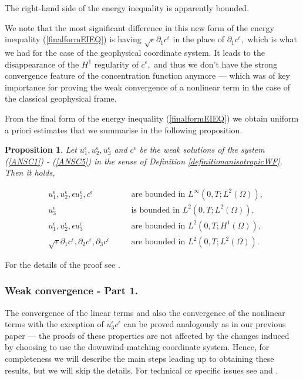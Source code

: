 \documentclass[11pt]{article}
\newtheorem{prop}{Proposition}
\begin{document}
The right-hand side of the energy inequality is apparently bounded.

We note that the most significant difference in this new form of the energy inequality (\ref{finalformEIEQ}) is having $\sqrt{\epsilon} \partial_1 c^\epsilon$ in the place of $\partial_1 c^\epsilon,$ which is what we had for the case of the geophysical coordinate system. It leads to the disappearance of the $H^1$ regularity of $c^\epsilon,$ and thus we don't have the strong convergence feature of the concentration function anymore --- which was of key importance for proving the weak convergence of a nonlinear term in the case of the classical geophysical frame.

From the final form of the energy inequality (\ref{finalformEIEQ}) we obtain uniform a priori estimates that we summarise in the following proposition.

\begin{prop} \label{aprioriprop}
Let $u^\epsilon_1, u^\epsilon_2, u^\epsilon_3$ and $c^\epsilon$ be the weak solutions of the system (\ref{ANSC1}) - (\ref{ANSC5}) in the sense of Definition \ref{definitionanisotropicWF}. Then it holds,

\begin{align}
& u^\epsilon_1, u^\epsilon_2, \epsilon u^\epsilon_3, c^\epsilon & \quad & \text{are bounded in $L^\infty (0,T; L^2(\Omega)),$} \label{proposition1} \\
& u^\epsilon_3 & \quad & \text{is bounded in $L^2 (0,T; L^2(\Omega)),$} \label{propositionExtra} \\
& u^\epsilon_1, u^\epsilon_2, \epsilon u^\epsilon_3 & \quad & \text{are bounded in $L^2(0,T; H^1(\Omega)),$} \label{proposition2} \\
& \sqrt{\epsilon} \partial_1 c^\epsilon, \partial_2 c^\epsilon, \partial_3 c^\epsilon & \quad & \text{are bounded in $L^2(0,T;L^2(\Omega)).$} \label{proposition3}
\end{align}

\end{prop}

For the details of the proof see \cite{pollatmws2019}.

\subsubsection{Weak convergence - Part 1.}

The convergence of the linear terms and also the convergence of the nonlinear terms with the exception of $u_3^\epsilon c^\epsilon$ can be proved analogously as in our previous paper --- the proofs of these properties are not affected by the changes induced by choosing to use the downwind-matching coordinate system. Hence, for completeness we will describe the main steps leading up to obtaining these results, but we will skip the details. For technical or specific issues see \cite{azerad2001mathematical} and \cite{pollatmws2019}.
\end{document}
